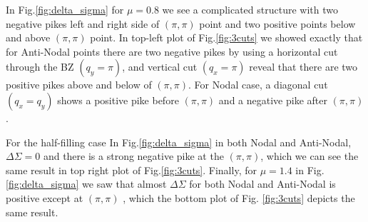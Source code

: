 In Fig.\ref{fig:delta_sigma} for $\mu=0.8$ we see a complicated structure with two negative pikes left and right side of $(\pi,\pi)$ point and two positive points below and above $(\pi,\pi)$ point. In top-left plot of Fig.\ref{fig:3cuts} we showed exactly that for Anti-Nodal points there are two negative pikes by using a horizontal cut through the BZ $(q_y=\pi)$, and vertical cut $(q_x=\pi)$ reveal that there are two positive pikes above and below of $(\pi,\pi)$. For Nodal case, a diagonal cut $(q_x=q_y)$ shows a positive pike before $(\pi,\pi)$ and a negative pike after $(\pi,\pi)$.

For the half-filling case In Fig.\ref{fig:delta_sigma}  in both Nodal and Anti-Nodal, $\Delta \Sigma=0$ and there is a strong negative pike at the $(\pi,\pi)$, which we can see the same result in top right plot of Fig.\ref{fig:3cuts}. Finally, for $\mu=1.4$ in Fig. \ref{fig:delta_sigma} we saw that almost $\Delta \Sigma$ for both Nodal and Anti-Nodal is positive except at $(\pi,\pi)$ , which the bottom plot of Fig. \ref{fig:3cuts} depicts the same result.



